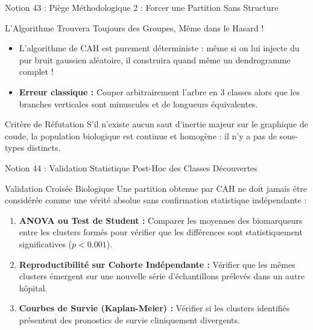 \documentclass[aspectratio=169,10pt]{beamer}
\begin{document}
\begin{frame}{Notion 43 : Piège Méthodologique 2 : Forcer une Partition Sans Structure}
  \begin{warnbox}{L'Algorithme Trouvera Toujours des Groupes, Même dans le Hasard !}
    \footnotesize
    \begin{itemize}
      \item L'algorithme de CAH est purement déterministe : même si on lui injecte du pur bruit gaussien aléatoire, il construira quand même un dendrogramme complet !
      \item \textbf{Erreur classique :} Couper arbitrairement l'arbre en 3 classes alors que les branches verticales sont minuscules et de longueurs équivalentes.
    \end{itemize}
  \end{warnbox}
  \vspace{1mm}
  \begin{conceptbox}{Critère de Réfutation}
    \footnotesize
    S'il n'existe aucun saut d'inertie majeur sur le graphique de coude, la population biologique est continue et homogène : il n'y a pas de sous-types distincts.
  \end{conceptbox}
\end{frame}

\begin{frame}{Notion 44 : Validation Statistique Post-Hoc des Classes Découvertes}
  \begin{conceptbox}{Validation Croisée Biologique}
    \footnotesize
    Une partition obtenue par CAH ne doit jamais être considérée comme une vérité absolue sans confirmation statistique indépendante :
    \begin{enumerate}
      \item \textbf{ANOVA ou Test de Student :} Comparer les moyennes des biomarqueurs entre les clusters formés pour vérifier que les différences sont statistiquement significatives ($p < 0.001$).
      \item \textbf{Reproductibilité sur Cohorte Indépendante :} Vérifier que les mêmes clusters émergent sur une nouvelle série d'échantillons prélevés dans un autre hôpital.
      \item \textbf{Courbes de Survie (Kaplan-Meier) :} Vérifier si les clusters identifiés présentent des pronostics de survie cliniquement divergents.
    \end{enumerate}
  \end{conceptbox}
\end{frame}
\end{document}
